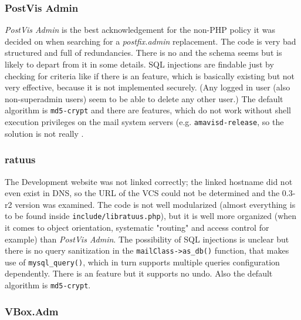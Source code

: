 \documentclass[12pt,a4paper]{scrartcl}
\begin{document}
			\subsubsection{PostVis Admin}

				\noindent
				\emph{PostVis Admin} is the best acknowledgement for the
				non-PHP policy it was decided on when searching for a
				\emph{postfix.admin} replacement. The code is very bad
				structured and full of redundancies. There is no  and the schema seems  but is likely to depart from it in
				some details. \ac{SQL} injections are findable just by checking
				for criteria like if there is an 
				feature, which is basically existing but not very effective,
				because it is not implemented securely. (Any logged in user
				(also non-superadmin users) seem to be able to delete any other
				user.) The default  algorithm is
				\texttt{md5-crypt} and there are features, which do not work
				without shell execution privileges on the mail system servers
				(e.g. \texttt{amavisd-release}, so the solution is not really
				.

			\subsubsection{ratuus}

				\noindent
				The Development website was not linked correctly; the linked
				hostname did not even exist in DNS, so the URL of the \ac{VCS}
				could not be determined and the 0.3-r2 version was examined.
				The code is not well modularized (almost everything is to be
				found inside \texttt{include/libratuus.php}), but it is well
				more organized (when it comes to object orientation, systematic
				"routing" and access control for example) than \emph{PostVis
				Admin}. The possibility of \ac{SQL} injections is unclear but
				there is no query sanitization in the
				\texttt{mailClass->as\_db()} function, that makes use of
				\texttt{mysql\_query()}, which in turn supports multiple
				queries configuration dependently. There is an  feature but it supports no undo. Also the default
				 algorithm is \texttt{md5-crypt}.

			\subsubsection{VBox.Adm}
\end{document}
